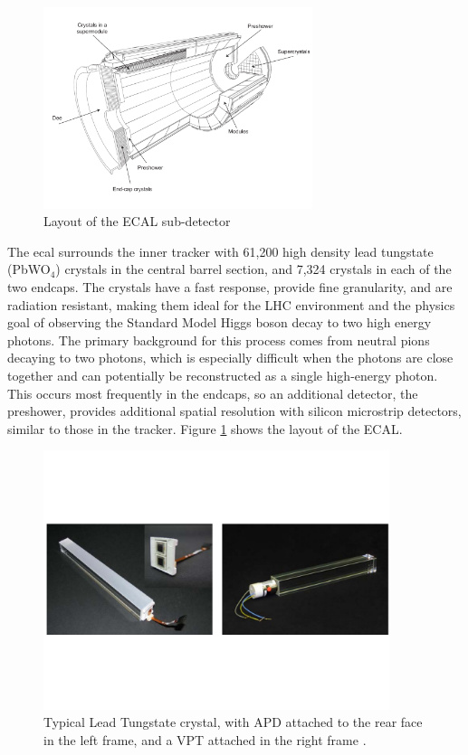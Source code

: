 \begin{figure}[h]
   \centering
  \includegraphics[width=0.7\textwidth]{Figures/CMS_Diagrams/ECAL__Layout.pdf}
  \caption{Layout of the ECAL sub-detector \cite{CMS:CMS_Machine_Chatrchyan:2008aa}} \label{fig:ecal_layout}
\end{figure}

\par The \acrfull{ecal} surrounds the inner tracker with 61,200 high
density lead tungstate (PbWO$_{4}$) crystals in the central barrel
section, and 7,324 crystals in each of the two endcaps.  The crystals
have a fast response, provide fine granularity, and are radiation
resistant, making them ideal for the LHC environment and the physics
goal of observing the Standard Model Higgs boson decay to two high
energy photons.  The primary background for this process comes
from neutral pions decaying to two photons, which is especially
difficult when the photons are close together and can potentially be
reconstructed as a single high-energy photon.  This occurs most
frequently in the endcaps, so an additional detector, the preshower,
provides additional spatial resolution with silicon microstrip
detectors, similar to those in the tracker. Figure
\ref{fig:ecal_layout} shows the layout of the ECAL.  

\begin{figure}[h]
   \centering
  \includegraphics[width=0.9\textwidth]{Figures/CMS_Diagrams/ECAL__Xtal.pdf}
  \caption{Typical Lead Tungstate crystal, with APD attached to the
    rear face in the left frame, and a VPT attached in the right
    frame \cite{CMS:CMS_Machine_Chatrchyan:2008aa}. } \label{fig:ecal_xtals}
\end{figure}

